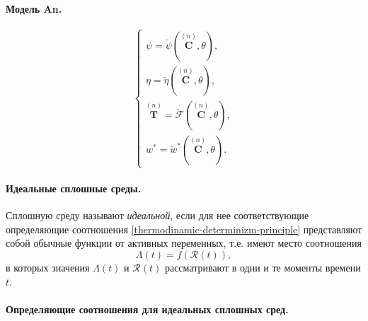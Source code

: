 \paragraph{Модель An.}
\[
  \begin{cases}
    \psi = \breve{\psi} ( \stackrel{(n)}{\mathbf{C}}, \theta ), \\
    \eta = \breve{\eta} ( \stackrel{(n)}{\mathbf{C}}, \theta ), \\
    \stackrel{(n)}{\mathbf{T}} = \breve{\mathcal{F}} ( \stackrel{(n)}{\mathbf{C}}, \theta ), \\
    w^* = \breve{w}^* ( \stackrel{(n)}{\mathbf{C}}, \theta ).
  \end{cases}
\]

\paragraph{Идеальные сплошные среды.}

\begin{definition}
  Сплошную среду называют \emph{идеальной}, если для нее
  соответствующие определяющие соотношения \eqref{thermodinamic-determinizm-principle} представляют собой
  обычные функции от активных переменных, т.е. имеют место соотношения
  \[
    \Lambda(t) = f(\mathcal{R}(t)),
  \]
  в которых значения $\Lambda(t)$ и $\mathcal{R}(t)$ рассматривают в одни и те
  моменты времени $t$.
\end{definition}

\paragraph{Определяющие соотношения для идеальных сплошных сред.}
